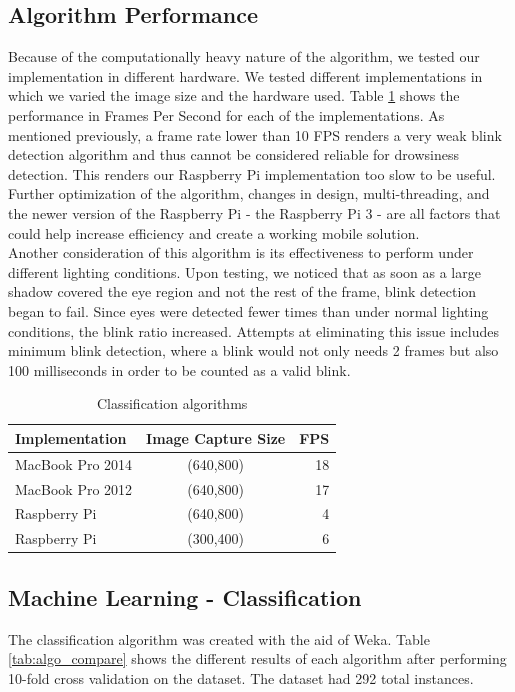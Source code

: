 \documentclass[twocolumn]{article}
\begin{document}
\subsection{Algorithm Performance}

Because of the computationally heavy nature of the algorithm, we tested our implementation in different hardware. We tested different implementations in which we varied the image size and the hardware used. Table \ref{tab:results_1} shows the performance in Frames Per Second for each of the implementations. As mentioned previously, a frame rate lower than 10 FPS renders a very weak blink detection algorithm and thus cannot be considered reliable for drowsiness detection. This renders our Raspberry Pi implementation too slow to be useful. Further optimization of the algorithm, changes in design, multi-threading, and the newer version of the Raspberry Pi - the Raspberry Pi 3 -  are all factors that could help increase efficiency and create a working mobile solution. \\
\medskip 
Another consideration of this algorithm is its effectiveness to perform under different lighting conditions. Upon testing, we noticed that as soon as a large shadow covered the eye region and not the rest of the frame, blink detection began to fail. Since eyes were detected fewer times than under normal lighting conditions, the blink ratio increased. Attempts at eliminating this issue includes minimum blink detection, where a blink would not only needs 2 frames but also 100 milliseconds in order to be counted as a valid blink. 

\begin{table}[H]
\centering
\begin{tabular}{l|c|r}
Implementation & Image Capture Size & FPS \\\hline
MacBook Pro 2014 &(640,800) & 18 \\
MacBook Pro 2012 &(640,800) & 17 \\
Raspberry Pi & (640,800) & 4 \\
Raspberry Pi & (300,400) & 6
\end{tabular}
\caption{\label{tab:results_1}Classification algorithms}
\end{table}

\subsection{Machine Learning - Classification}

The classification algorithm was created with the aid of Weka. Table \ref{tab:algo_compare} shows the different results of each algorithm after performing 10-fold cross validation on the dataset. The dataset had 292 total instances.  
\end{document}
